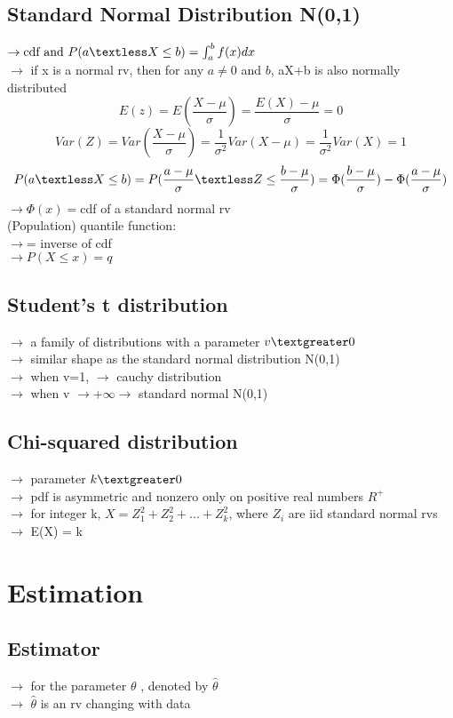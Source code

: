 \documentclass{article}
\begin{document}
\subsection{Standard Normal Distribution N(0,1)}
$\rightarrow \text{cdf and } P(a \textless X \leq b) = \int_a^b f(x)dx$\\
$\rightarrow$ if x is a normal rv, then for any $a\neq0$ and $b$, aX+b is also normally distributed\\
\[E(z) = E(\frac{X-\mu}{\sigma}) = \frac{E(X)-\mu}{\sigma} = 0\]
\[Var(Z) = Var(\frac{X-\mu}{\sigma}) = \frac{1}{\sigma^2}Var(X-\mu) = \frac{1}{\sigma^2}Var(X)=1\]
\[P(a \textless X \leq b) = P(\frac{a-\mu}{\sigma} \textless Z \leq \frac{b-\mu}{\sigma}) = \Phi(\frac{b-\mu}{\sigma})- \Phi(\frac{a-\mu}{\sigma})\]
$\rightarrow \Phi(x)=$cdf of a standard normal rv\\
(Population) quantile function:\\
$\rightarrow$= inverse of cdf\\
$\rightarrow P(X \leq x) =q$\\
\subsection{Student's t distribution}
$\rightarrow$ a family of distributions with a parameter $v \textgreater 0$\\
$\rightarrow$ similar shape as the standard normal distribution N(0,1)\\
$\rightarrow$ when v=1, $\rightarrow$ cauchy distribution\\
$\rightarrow$ when v $\rightarrow +\infty \rightarrow$ standard normal N(0,1)
\subsection{Chi-squared distribution}
$\rightarrow$ parameter $k \textgreater 0$\\
$\rightarrow$ pdf is asymmetric and nonzero only on positive real numbers $R^+$\\
$\rightarrow$ for integer k, $X = Z_1^2 +Z_2^2 +...+Z_k^2$, where $Z_i$ are iid standard normal rvs\\
$\rightarrow$ E(X) = k\\
\newpage
\section{Estimation}
\subsection{Estimator}
$\rightarrow$ for the parameter $\theta$ , denoted by $\hat{\theta}$\\
$\rightarrow$ $\hat{\theta}$ is an rv changing with data
\end{document}
